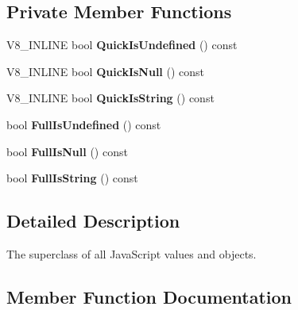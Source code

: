 \subsection*{Private Member Functions}
\begin{DoxyCompactItemize}
\item 
V8\+\_\+\+I\+N\+L\+I\+NE bool {\bfseries Quick\+Is\+Undefined} () const \hypertarget{classv8_1_1_value_a80cab2e4f0894f2361476d7c6bec7f75}{}\label{classv8_1_1_value_a80cab2e4f0894f2361476d7c6bec7f75}

\item 
V8\+\_\+\+I\+N\+L\+I\+NE bool {\bfseries Quick\+Is\+Null} () const \hypertarget{classv8_1_1_value_a2f0567aca0427f3920e349cd20194aa6}{}\label{classv8_1_1_value_a2f0567aca0427f3920e349cd20194aa6}

\item 
V8\+\_\+\+I\+N\+L\+I\+NE bool {\bfseries Quick\+Is\+String} () const \hypertarget{classv8_1_1_value_acab2652413965f7e88013342efd648ff}{}\label{classv8_1_1_value_acab2652413965f7e88013342efd648ff}

\item 
bool {\bfseries Full\+Is\+Undefined} () const \hypertarget{classv8_1_1_value_a73d1a2e9fe0284507df0a82b5637a85a}{}\label{classv8_1_1_value_a73d1a2e9fe0284507df0a82b5637a85a}

\item 
bool {\bfseries Full\+Is\+Null} () const \hypertarget{classv8_1_1_value_afa92f34e9435f763955651cac0d6300d}{}\label{classv8_1_1_value_afa92f34e9435f763955651cac0d6300d}

\item 
bool {\bfseries Full\+Is\+String} () const \hypertarget{classv8_1_1_value_a20d7eab60cf2222369303ef4cdc43a7c}{}\label{classv8_1_1_value_a20d7eab60cf2222369303ef4cdc43a7c}

\end{DoxyCompactItemize}


\subsection{Detailed Description}
The superclass of all Java\+Script values and objects. 

\subsection{Member Function Documentation}
